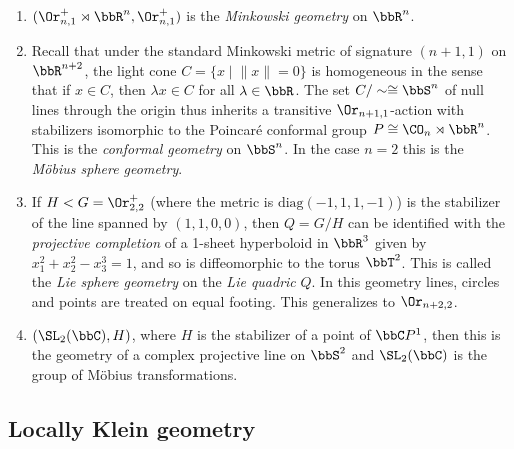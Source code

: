 \begin{example}
\begin{enumerate}
        \item $(\Or_{n,1}^+\rtimes\bbR^n,\Or_{n,1}^+)$ is the \emph{Minkowski geometry} on $\bbR^n$.

        \item Recall that under the standard Minkowski metric of signature $(n+1,1)$ on $\bbR^{n+2}$, the light cone $C=\{x\mid \lVert x\rVert=0\}$ is homogeneous in the sense that if $x\in C$, then $\lambda x\in C$ for all $\lambda\in\bbR$. The set $C\slash \sim\cong\bbS^n$ of null lines through the origin thus inherits a transitive $\Or_{n+1,1}$-action with stabilizers isomorphic to the Poincar\'e conformal group $P\cong \CO_n\rtimes \bbR^n$. This is the \emph{conformal geometry} on $\bbS^n$. In the case $n=2$ this is the \emph{M\"obius sphere geometry}.

        \item If $H<G=\Or_{2,2}^+$ (where the metric is $\mathrm{diag}(-1,1,1,-1)$) is the stabilizer of the line spanned by $(1,1,0,0)$, then $Q=G\slash H$ can be identified with the \emph{projective completion} of a 1-sheet hyperboloid in $\bbR^3$ given by $x_1^2+x_2^2-x_3^3=1$, and so is diffeomorphic to the torus $\bbT^2$. This is called the \emph{Lie sphere geometry} on the \emph{Lie quadric} $Q$. In this geometry lines, circles and points are treated on equal footing. This generalizes to $\Or_{n+2,2}$.

        \item $(\SL_2(\bbC),H)$, where $H$ is the stabilizer of a point of $\bbC P^1$, then this is the geometry of a complex projective line on $\bbS^2$ and $\SL_2(\bbC)$ is the group of M\"obius transformations.
    \end{enumerate}
\end{example}






\subsection{Locally Klein geometry}




